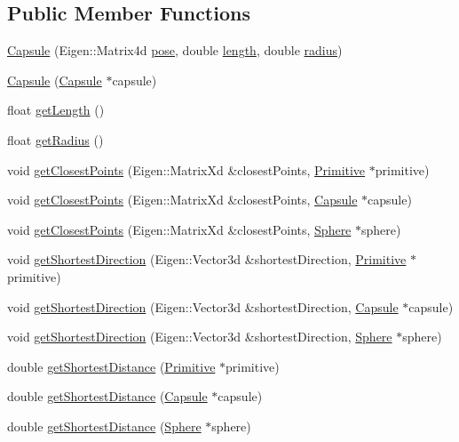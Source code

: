 \subsection*{Public Member Functions}
\begin{DoxyCompactItemize}
\item 
\hyperlink{class_capsule_aab6d0827aa8179c3f258129161a67e2e}{Capsule} (Eigen\+::\+Matrix4d \hyperlink{class_primitive_ad8b2afbad412f6046783d155c88fe312}{pose}, double \hyperlink{class_capsule_af62f20ecfc37b4c8ae88dd505ca1f196}{length}, double \hyperlink{class_capsule_a9b7e591748a2b735b35d99a2d7792f39}{radius})
\item 
\hyperlink{class_capsule_a94838c4642111c07dbf83fdc775d1a68}{Capsule} (\hyperlink{class_capsule}{Capsule} $\ast$capsule)
\item 
float \hyperlink{class_capsule_a8ff7a408a608ee32dea8c187fce5dbea}{get\+Length} ()
\item 
float \hyperlink{class_capsule_a4e98e8545ea57fe682c5a2002bd49bdb}{get\+Radius} ()
\item 
void \hyperlink{class_capsule_aec53e0cf5f8644f1413c3c208de64cc7}{get\+Closest\+Points} (Eigen\+::\+Matrix\+Xd \&closest\+Points, \hyperlink{class_primitive}{Primitive} $\ast$primitive)
\item 
void \hyperlink{class_capsule_a9da1b4c44adba1726446a4fb37b7a7e0}{get\+Closest\+Points} (Eigen\+::\+Matrix\+Xd \&closest\+Points, \hyperlink{class_capsule}{Capsule} $\ast$capsule)
\item 
void \hyperlink{class_capsule_aa0fea610bb1a1e4016bbda0f4f88264a}{get\+Closest\+Points} (Eigen\+::\+Matrix\+Xd \&closest\+Points, \hyperlink{class_sphere}{Sphere} $\ast$sphere)
\item 
void \hyperlink{class_capsule_ad569eae23b91f33e145f06745739e428}{get\+Shortest\+Direction} (Eigen\+::\+Vector3d \&shortest\+Direction, \hyperlink{class_primitive}{Primitive} $\ast$primitive)
\item 
void \hyperlink{class_capsule_a28274c18ef5a3b9ef869caa64d5f7d5e}{get\+Shortest\+Direction} (Eigen\+::\+Vector3d \&shortest\+Direction, \hyperlink{class_capsule}{Capsule} $\ast$capsule)
\item 
void \hyperlink{class_capsule_aae076a389170bd6644f479bfe9c243bc}{get\+Shortest\+Direction} (Eigen\+::\+Vector3d \&shortest\+Direction, \hyperlink{class_sphere}{Sphere} $\ast$sphere)
\item 
double \hyperlink{class_capsule_a43bcc7bb95425a4559f7fd0289ef8b45}{get\+Shortest\+Distance} (\hyperlink{class_primitive}{Primitive} $\ast$primitive)
\item 
double \hyperlink{class_capsule_ade8880442a9230f893c296f0681ae9ad}{get\+Shortest\+Distance} (\hyperlink{class_capsule}{Capsule} $\ast$capsule)
\item 
double \hyperlink{class_capsule_a71d7821f3e7f9ac972bceb06d82f529d}{get\+Shortest\+Distance} (\hyperlink{class_sphere}{Sphere} $\ast$sphere)
\end{DoxyCompactItemize}
